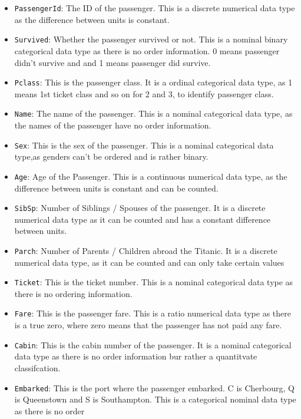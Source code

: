 \documentclass[a4paper, twocolumn]{article}
\begin{document}
\begin{itemize}
    \item \texttt{PassengerId}: The ID of the passenger. This is
    a discrete numerical data type as the difference between units 
    is constant.
    \item \texttt{Survived}: Whether the passenger survived or not. 
    This is a nominal binary categorical data type as there is no 
    order information. 0 means passenger didn't survive and and 1
    means passenger did survive.
    \item \texttt{Pclass}: This is the passenger class. It is a 
    ordinal categorical data type, as 1 means 1st ticket class and 
    so on for 2 and 3, to identify passenger class.
    \item \texttt{Name}: The name of the passenger. This is a 
    nominal categorical data type, as the names of the passenger 
    have no order information.
    \item \texttt{Sex}: This is the sex of the passenger. 
    This is a nominal categorical data type,as genders can't be 
    ordered and is rather binary.
    \item \texttt{Age}: Age of the Passenger. This is a continuous
    numerical data type, as the difference between units is 
    constant and can be counted.
    \item \texttt{SibSp}: Number of Siblings / Spouses of the
    passenger. It is a discrete numerical data type as it can be 
    counted and has a constant difference between units.
    \item \texttt{Parch}: Number of Parents / Children abroad the 
    Titanic. It is a discrete numerical data type, as it can be 
    counted and can only take certain values
    \item \texttt{Ticket}: This is the ticket number. This is a 
    nominal categorical data type as there is no ordering 
    information.
    \item \texttt{Fare}: This is the passenger fare. This is a ratio
    numerical data type as there is a true zero, where zero means
    that the passenger has not paid any fare.
    \item \texttt{Cabin}: This is the cabin number of the passenger.
    It is a nominal categorical data type as there is no order
    information bur rather a quantitvate classifcation.
    \item \texttt{Embarked}: This is the port where the passenger
    embarked. C is Cherbourg, Q is Queenstown and S is Southampton.
    This is a categorical nominal data type as there is no order

\end{itemize}
\end{document}
